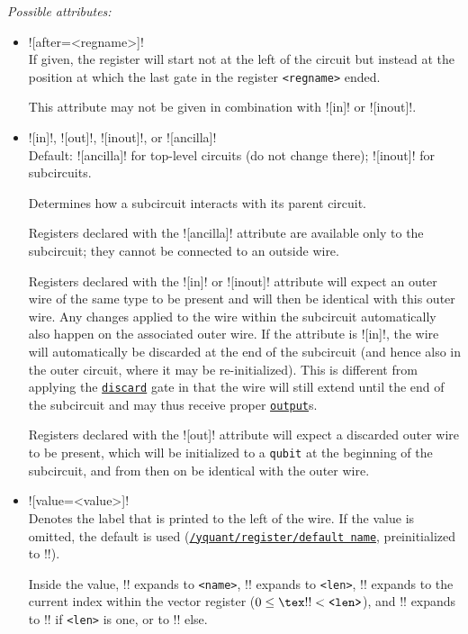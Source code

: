 \documentclass{scrartcl}
\def\gate#1{\hyperref[gate:#1]{\texttt{#1}}}
\def\style#1{\hyperref[style:#1]{\texttt{#1}}}
\begin{document}
         \emph{Possible attributes:}
         \begin{itemize}
            \item \yquant![after=<regname>]! \\
               If given, the register will start not at the left of the circuit but instead at the position at which the last gate in the register \texttt{<regname>} ended.

               This attribute may not be given in combination with \yquant![in]! or \yquant![inout]!.
            \item {}\yquant![in]!, \yquant![out]!, \yquant![inout]!, or \yquant![ancilla]! \\
               Default: \yquant![ancilla]! for top\hyp level circuits (do not change there); \yquant![inout]! for subcircuits.

               Determines how a subcircuit interacts with its parent circuit.

               Registers declared with the \yquant![ancilla]! attribute are available only to the subcircuit; they cannot be connected to an outside wire.

               Registers declared with the \yquant![in]! or \yquant![inout]! attribute will expect an outer wire of the same type to be present and will then be identical with this outer wire.
               Any changes applied to the wire within the subcircuit automatically also happen on the associated outer wire.
               If the attribute is \yquant![in]!, the wire will automatically be discarded at the end of the subcircuit (and hence also in the outer circuit, where it may be re\hyp initialized).
               This is different from applying the \gate{discard} gate in that the wire will still extend until the end of the subcircuit and may thus receive proper \gate{output}s.

               Registers declared with the \yquant![out]! attribute will expect a discarded outer wire to be present, which will be initialized to a \texttt{qubit} at the beginning of the subcircuit, and from then on be identical with the outer wire.
            \item \yquant![value=<value>]! \\
               Denotes the label that is printed to the left of the wire.
               If the value is omitted, the default is used (\style{/yquant/register/default name}, preinitialized to \tex!\regidx!).

               Inside the value, \tex!\reg! expands to \texttt{<name>}, \tex!\len! expands to \texttt{<len>}, \tex!\idx! expands to the current index within the vector register ($0 \leq \text{\tex!\idx!} < \text{\texttt{<len>}}$), and \tex!\regidx! expands to \tex!\reg! if \texttt{<len>} is one, or to \tex!\reg[\idx]! else.
         \end{itemize}
\end{document}
